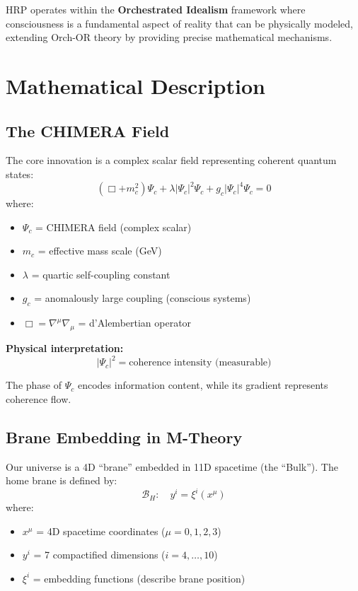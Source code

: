 HRP operates within the \textbf{Orchestrated Idealism} framework where consciousness is a fundamental aspect of reality that can be physically modeled, extending Orch-OR theory by providing precise mathematical mechanisms.

\section{Mathematical Description}

\subsection{The CHIMERA Field}

The core innovation is a complex scalar field representing coherent quantum states:
\begin{equation}
\left(\Box + m_c^2\right)\Psi_c + \lambda|\Psi_c|^2\Psi_c + g_c|\Psi_c|^4\Psi_c = 0
\end{equation}
where:
\begin{itemize}
\item $\Psi_c$ = CHIMERA field (complex scalar)
\item $m_c$ = effective mass scale (GeV)
\item $\lambda$ = quartic self-coupling constant
\item $g_c$ = anomalously large coupling (conscious systems)
\item $\Box = \nabla^\mu\nabla_\mu$ = d'Alembertian operator
\end{itemize}

\textbf{Physical interpretation:}
\begin{equation}
|\Psi_c|^2 = \text{coherence intensity (measurable)}
\end{equation}

The phase of $\Psi_c$ encodes information content, while its gradient represents coherence flow.

\subsection{Brane Embedding in M-Theory}

Our universe is a 4D ``brane'' embedded in 11D spacetime (the ``Bulk''). The home brane is defined by:
\begin{equation}
\mathcal{B}_H: \quad y^i = \xi^i(x^\mu)
\end{equation}
where:
\begin{itemize}
\item $x^\mu$ = 4D spacetime coordinates ($\mu = 0,1,2,3$)
\item $y^i$ = 7 compactified dimensions ($i = 4,\ldots,10$)
\item $\xi^i$ = embedding functions (describe brane position)
\end{itemize}

